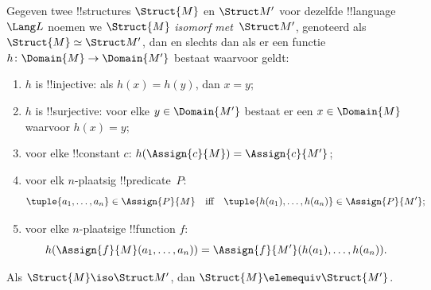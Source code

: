 \documentclass[openany]{memoir}
\begin{document}
\begin{defn}
 Gegeven twee !!{structure}s $\Struct{M}$ en
$\Struct M'$ voor dezelfde !!{language}~$\Lang L$ noemen we
$\Struct{M}$ \emph{isomorf met}~$\Struct M'$, genoteerd als $\Struct{M}
\simeq \Struct M'$, dan en slechts dan als er een functie $h \colon
\Domain{M} \to \Domain{M'}$ bestaat waarvoor geldt:
\begin{enumerate}
\item $h$ is !!{injective}: als $h(x) =
  h(y)$, dan $x = y$; 
\item $h$ is !!{surjective}: voor elke $y \in \Domain{M'}$ bestaat
  er een $x \in \Domain{M}$ waarvoor $h(x) = y$;
\item {}voor elke !!{constant} $c$:
  $h(\Assign{c}{M}) = \Assign{c}{M'}$;
\item {}voor elk $n$-plaatsig !!{predicate}~$P$:
  \[
  \tuple{a_1, \dots, a_n}\in \Assign{P}{M} \quad\text{iff}\quad
  \tuple{h(a_1), \dots, h(a_n)} \in \Assign{P}{M'};
  \]
\item {}voor elke $n$-plaatsige !!{function} $f$:
  \[
  h(\Assign{f}{M}(a_1, \dots, a_n)) =
  \Assign{f}{M'}(h(a_1), \dots, h(a_n)).
  \]
\end{enumerate}
\end{defn}

\begin{thm}
Als $\Struct{M} \iso \Struct M'$, dan $\Struct{M} \elemequiv
\Struct{M'}$.
\end{thm}
\end{document}
